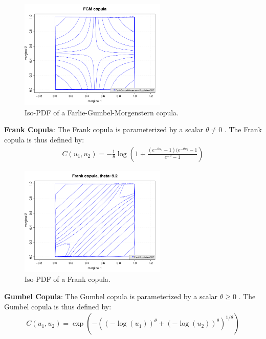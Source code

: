 {  \begin{figure}[H]
    \begin{center}
      \includegraphics[width=7cm]{Figures/FarlieGumbelMorgensternCopula.pdf}
      \caption{Iso-PDF of a  Farlie-Gumbel-Morgenstern copula.}
    \end{center}
  \end{figure}


  {\bf Frank Copula}: The Frank copula is parameterized by a scalar $\theta \neq 0 $  . The Frank copula is thus defined by:
  \begin{align*}
    C(u_1, u_2) =\displaystyle -\frac{1}{\theta}\log\left(1+\frac{(e^{-\theta u_1}-1)(e^{-\theta u_2}-1}{e^{-\theta}-1}\right)
  \end{align*}




  \begin{figure}[H]
    \begin{center}
      \includegraphics[width=7cm]{Figures/FrankCopula.pdf}
    \end{center}
    \caption{Iso-PDF of a Frank copula.}
  \end{figure}



  {\bf Gumbel Copula}: The Gumbel copula is parameterized by a scalar $\theta \geq 0 $ . The Gumbel copula is thus defined by:
  \begin{align*}
    C(u_1, u_2) =\displaystyle \exp\left(-\left((-\log(u_1))^{\theta}+(-\log(u_2))^{\theta}\right)^{1/\theta}\right)
  \end{align*}



}
